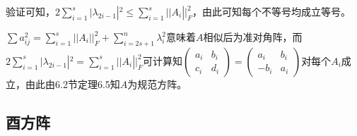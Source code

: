 \documentclass[a4paper,UTF8,fontset=windows]{ctexart}
\begin{document}
\begin{enumerate}
验证可知，$2\sum_{i=1}^{s}{|\lambda_{2i-1}}|^2\le\sum_{i=1}^{s}{||A_i}||_F^2$，由此可知每个不等号均成立等号。

$\sum a_{ij}^2=\sum_{i=1}^{s}{||A_i}||_F^2+\sum_{i=2s+1}^{n}\lambda_i^2$意味着$A$相似后为准对角阵，而$2\sum_{i=1}^{s}{|\lambda_{2i-1}}|^2=\sum_{i=1}^{s}{||A_i}||_F^2$可计算知$\begin{pmatrix}a_i&b_i\\c_i&d_i\end{pmatrix}=\begin{pmatrix}a_i&b_i\\-b_i&a_i\end{pmatrix}$对每个$A_i$成立，由此由6.2节定理6.5知$A$为规范方阵。
\end{enumerate}

\subsection{酉方阵}
\end{document}
